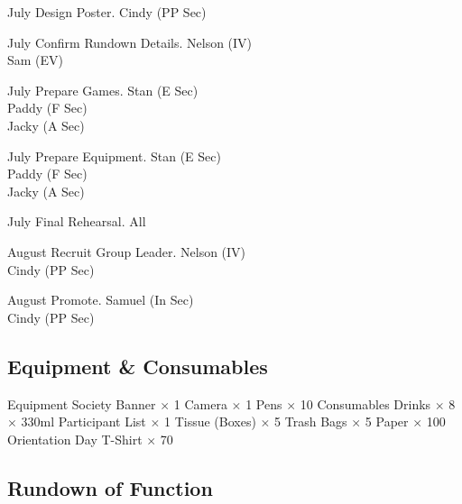 \bTR{}
\eTD{} July
\eTD\bTD Design Poster.
\eTD\bTD Cindy (PP Sec)
\eTD\eTR

\bTR{}
\eTD{} July
\eTD\bTD Confirm Rundown Details.
\eTD\bTD Nelson (IV) \\ Sam (EV)
\eTD\eTR

\bTR{}
\eTD{} July
\eTD\bTD Prepare Games.
\eTD\bTD Stan (E Sec) \\ Paddy (F Sec) \\ Jacky (A Sec)
\eTD\eTR

\bTR{}
\eTD{} July
\eTD\bTD Prepare Equipment.
\eTD\bTD Stan (E Sec) \\ Paddy (F Sec) \\ Jacky (A Sec)
\eTD\eTR

\bTR{}
\eTD{} July
\eTD\bTD Final Rehearsal.
\eTD\bTD All
\eTD\eTR

\bTR{}
\eTD{} August
\eTD\bTD Recruit Group Leader.
\eTD\bTD Nelson (IV) \\ Cindy (PP Sec)
\eTD\eTR

\bTR{}
\eTD{} August
\eTD\bTD Promote.
\eTD\bTD Samuel (In Sec) \\ Cindy (PP Sec)
\eTD\eTR

\eTABLEbody
\eTABLE

\subsection{Equipment \& Consumables}
\starttabulate[|l|l|]
\NC{}Equipment\NC\NR
\HL
\NC Society Banner          \NC $\times$ 1  \NR
\NC Camera                  \NC $\times$ 1  \NR
\NC Pens                    \NC $\times$ 10 \NR
\HL
\NR
\NC{}Consumables\NC\NR
\HL
\NC Drinks                   $\times$ 8 $\times$ 330ml \NR
\NC Participant List        \NC $\times$ 1      \NR
\NC Tissue (Boxes)          \NC $\times$ 5      \NR
\NC Trash Bags              \NC $\times$ 5      \NR
\NC Paper                   \NC $\times$ 100    \NR
\NC Orientation Day T-Shirt \NC $\times$ 70     \NR
\HL
\stoptabulate

\subsection{Rundown of Function}

\setupTABLE[c][1][width=1.25in]
\setupTABLE[c][2][width=3.5in]
\setupTABLE[c][3][width=1.25in]
\bTABLE
\bTABLEhead

